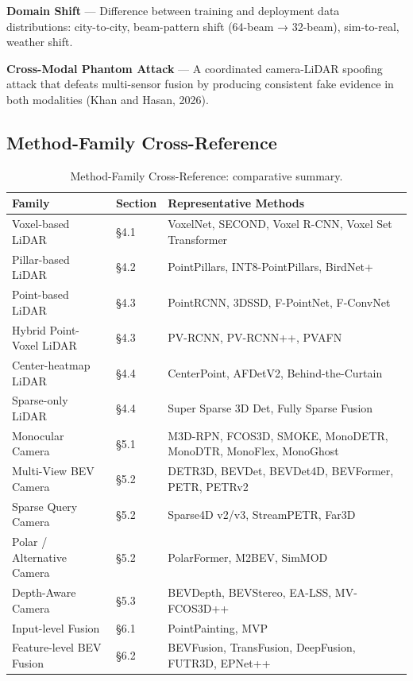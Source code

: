 \documentclass{article}
\begin{document}
\textbf{Domain Shift} --- Difference between training and deployment data distributions: city-to-city, beam-pattern shift (64-beam → 32-beam), sim-to-real, weather shift.

\textbf{Cross-Modal Phantom Attack} --- A coordinated camera-LiDAR spoofing attack that defeats multi-sensor fusion by producing consistent fake evidence in both modalities (Khan and Hasan, 2026).

\subsection{Method-Family Cross-Reference}\label{method-family-cross-reference}

\begin{table}[t]
\centering
\caption{Method-Family Cross-Reference: comparative summary.}
\label{tab:method-family-cross-reference}
\begin{tabular}{>{\raggedright\arraybackslash}p{0.2737\linewidth}
  >{\raggedright\arraybackslash}p{0.0737\linewidth}
  >{\raggedright\arraybackslash}p{0.6526\linewidth}}
\toprule
Family & Section & Representative Methods \\
\midrule
Voxel-based LiDAR & §4.1 & VoxelNet, SECOND, Voxel R-CNN, Voxel Set Transformer \\
Pillar-based LiDAR & §4.2 & PointPillars, INT8-PointPillars, BirdNet+ \\
Point-based LiDAR & §4.3 & PointRCNN, 3DSSD, F-PointNet, F-ConvNet \\
Hybrid Point-Voxel LiDAR & §4.3 & PV-RCNN, PV-RCNN++, PVAFN \\
Center-heatmap LiDAR & §4.4 & CenterPoint, AFDetV2, Behind-the-Curtain \\
Sparse-only LiDAR & §4.4 & Super Sparse 3D Det, Fully Sparse Fusion \\
Monocular Camera & §5.1 & M3D-RPN, FCOS3D, SMOKE, MonoDETR, MonoDTR, MonoFlex, MonoGhost \\
Multi-View BEV Camera & §5.2 & DETR3D, BEVDet, BEVDet4D, BEVFormer, PETR, PETRv2 \\
Sparse Query Camera & §5.2 & Sparse4D v2/v3, StreamPETR, Far3D \\
Polar / Alternative Camera & §5.2 & PolarFormer, M2BEV, SimMOD \\
Depth-Aware Camera & §5.3 & BEVDepth, BEVStereo, EA-LSS, MV-FCOS3D++ \\
Input-level Fusion & §6.1 & PointPainting, MVP \\
Feature-level BEV Fusion & §6.2 & BEVFusion, TransFusion, DeepFusion, FUTR3D, EPNet++ \\

\end{tabular}
\end{table}
\end{document}
